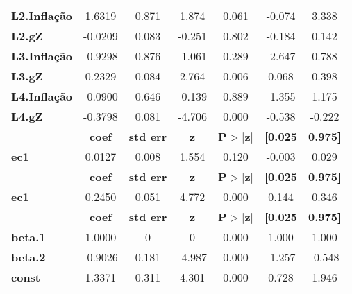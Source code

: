 \begin{center}
\begin{tabular}{lcccccc}
\textbf{L2.Inflação} &       1.6319  &        0.871     &     1.874  &         0.061        &       -0.074    &        3.338     \\
\textbf{L2.gZ}       &      -0.0209  &        0.083     &    -0.251  &         0.802        &       -0.184    &        0.142     \\
\textbf{L3.Inflação} &      -0.9298  &        0.876     &    -1.061  &         0.289        &       -2.647    &        0.788     \\
\textbf{L3.gZ}       &       0.2329  &        0.084     &     2.764  &         0.006        &        0.068    &        0.398     \\
\textbf{L4.Inflação} &      -0.0900  &        0.646     &    -0.139  &         0.889        &       -1.355    &        1.175     \\
\textbf{L4.gZ}       &      -0.3798  &        0.081     &    -4.706  &         0.000        &       -0.538    &       -0.222     \\
             & \textbf{coef} & \textbf{std err} & \textbf{z} & \textbf{P$> |$z$|$} & \textbf{[0.025} & \textbf{0.975]}  \\
\midrule
\textbf{ec1} &       0.0127  &        0.008     &     1.554  &         0.120        &       -0.003    &        0.029     \\
             & \textbf{coef} & \textbf{std err} & \textbf{z} & \textbf{P$> |$z$|$} & \textbf{[0.025} & \textbf{0.975]}  \\
\midrule
\textbf{ec1} &       0.2450  &        0.051     &     4.772  &         0.000        &        0.144    &        0.346     \\
                & \textbf{coef} & \textbf{std err} & \textbf{z} & \textbf{P$> |$z$|$} & \textbf{[0.025} & \textbf{0.975]}  \\
\midrule
\textbf{beta.1} &       1.0000  &            0     &         0  &         0.000        &        1.000    &        1.000     \\
\textbf{beta.2} &      -0.9026  &        0.181     &    -4.987  &         0.000        &       -1.257    &       -0.548     \\
\textbf{const}  &       1.3371  &        0.311     &     4.301  &         0.000        &        0.728    &        1.946     \\
\bottomrule
\end{tabular}
\end{center}